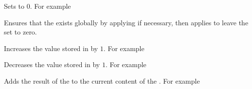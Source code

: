 \documentclass[oneside]{book}
\begin{document}
\begin{function}{\intZero}
\begin{syntax}
 
\end{syntax}
Sets  to $0$. For example
\begin{demohigh}
\intSet {}
\intZero \lTmpaInt
\intUse \lTmpaInt
\end{demohigh}
\end{function}

\begin{function}{\intZeroNew}
\begin{syntax}
 
\end{syntax}
Ensures that the  exists globally by applying
 if necessary, then applies  to leave
the  set to zero.
\end{function}

\begin{function}{\intIncr}
\begin{syntax}
 
\end{syntax}
Increases the value stored in  by $1$.
For example
\begin{demohigh}
\intSet {}
\intIncr \lTmpaInt
\intUse \lTmpaInt
\end{demohigh}
\end{function}

\begin{function}{\intDecr}
\begin{syntax}
 
\end{syntax}
Decreases the value stored in  by $1$.
For example
\begin{demohigh}
\intSet {}
\intDecr \lTmpaInt
\intUse \lTmpaInt
\end{demohigh}
\end{function}

\begin{function}{\intAdd}
\begin{syntax}
  
\end{syntax}
Adds the result of the  to the current
content of the . For example
\begin{demohigh}
\intSet {}
\intAdd {}
\intUse \lTmpaInt
\end{demohigh}
\end{function}
\end{document}
